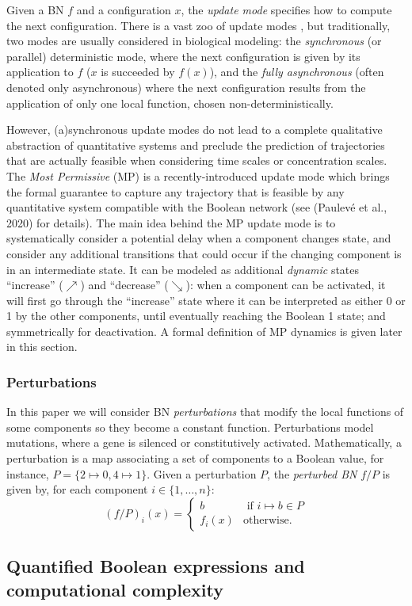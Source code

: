 \documentclass[PCJ,Unicode,screen,mode=plain]{cedram}
\begin{document}
Given a BN \(f\) and a configuration \(x\), the \emph{update mode}
specifies how to compute the next configuration. There is a vast zoo of
update modes \citep{PS22}, but traditionally, two modes are usually
considered in biological modeling: the \emph{synchronous} (or parallel)
deterministic mode, where the next configuration is given by its
application to \(f\) (\(x\) is succeeded by \(f(x)\)), and the
\emph{fully asynchronous} (often denoted only asynchronous) where the
next configuration results from the application of only one local
function, chosen non-deterministically.

However, (a)synchronous update modes do not lead to a complete
qualitative abstraction of quantitative systems and preclude the
prediction of trajectories that are actually feasible when considering
time scales or concentration scales. The \emph{Most Permissive} (MP)
\citep{Pauleve2020,Pauleve2021} is a recently-introduced update mode
which brings the formal guarantee to capture any trajectory that is
feasible by any quantitative system compatible with the Boolean network
(see (Paulevé et al., 2020) for details). The main idea behind the MP
update mode is to systematically consider a potential delay when a
component changes state, and consider any additional transitions that
could occur if the changing component is in an intermediate state. It
can be modeled as additional \emph{dynamic} states ``increase''
(\(\nearrow\)) and ``decrease'' (\(\searrow\)): when a component can be
activated, it will first go through the ``increase'' state where it can
be interpreted as either 0 or 1 by the other components, until
eventually reaching the Boolean 1 state; and symmetrically for
deactivation. A formal definition of MP dynamics is given later in this
section.

\hypertarget{perturbations}{%
\subsubsection{Perturbations}\label{perturbations}}

In this paper we will consider BN \emph{perturbations} that modify the
local functions of some components so they become a constant function.
Perturbations model mutations, where a gene is silenced or
constitutively activated. Mathematically, a perturbation is a map
associating a set of components to a Boolean value, for instance,
\(P = \{ 2 \mapsto 0, 4 \mapsto 1\}\). Given a perturbation \(P\), the
\emph{perturbed BN} \(f/P\) is given by, for each component
\(i\in \{1,\ldots,n\}\): \[
(f/P)_i(x) = \begin{cases}
b & \text{ if }i \mapsto b \in P\\
f_i(x) & \text{otherwise.}
\end{cases}
\]
\hypertarget{quantified-boolean-expressions-and-computational-complexity}{%
\subsection{Quantified Boolean expressions and computational
complexity}\label{quantified-boolean-expressions-and-computational-complexity}}
\end{document}
